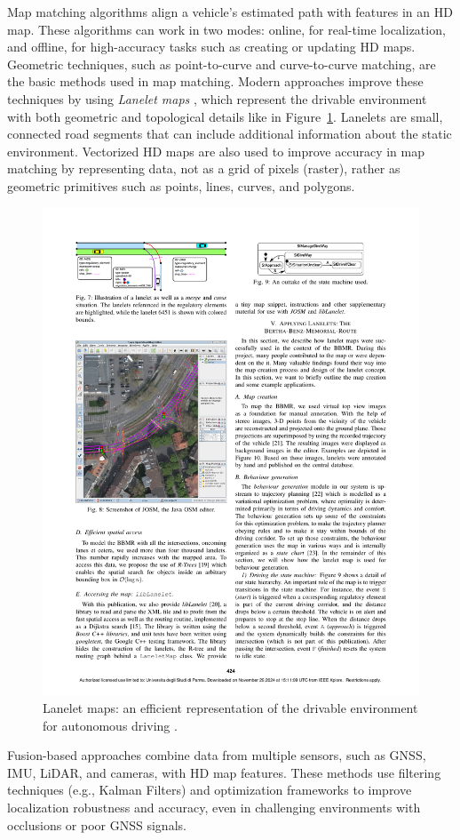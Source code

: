 Map matching algorithms align a vehicle's estimated path with features in an HD map. These algorithms can work in two modes: online, for real-time localization, and offline, for high-accuracy tasks such as creating or updating HD maps. 
Geometric techniques, such as point-to-curve and curve-to-curve matching, are the basic methods used in map matching. Modern approaches improve these techniques by using \textit{Lanelet maps} \cite{6856487}, which represent the drivable environment with both geometric and topological details like in Figure~\ref{fig:lanelet-map}. Lanelets are small, connected road segments that can include additional information about the static environment. Vectorized HD maps are also used to improve accuracy in map matching by representing data, not as a grid of pixels (raster), rather as geometric primitives such as points, lines, curves, and polygons.
\begin{figure}[H]
    \centering
    \includegraphics[width=0.75\linewidth]{LateX//figs/Lanelets_Efficient_map_representation_for_autonomous_driving.pdf}
    \caption{Lanelet maps: an efficient representation of the drivable environment for autonomous driving \cite{6856487}.}
    \label{fig:lanelet-map}
\end{figure}

Fusion-based approaches combine data from multiple sensors, such as GNSS, IMU, LiDAR, and cameras, with HD map features. These methods use filtering techniques (e.g., Kalman Filters) and optimization frameworks to improve localization robustness and accuracy, even in challenging environments with occlusions or poor GNSS signals. 

